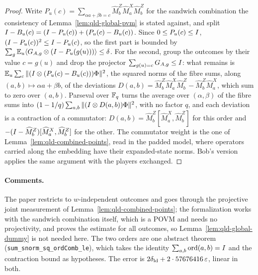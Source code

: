 \begin{proof}
\leanok
Write $P_u(c) = \sum_{\alpha a + \beta b = c} \widehat M^Z_b \widehat M^X_a \widehat M^Z_b$ for
the sandwich combination the consistency of Lemma~\ref{lem:qld-global-pvm} is stated against,
and split $I - B_u(c) = (I - P_u(c)) + (P_u(c) - B_u(c))$. Since $0 \leq P_u(c) \leq I$,
$(I - P_u(c))^2 \leq I - P_u(c)$, so the first part is bounded by
$\sum_g \mathbb E_u \langle G_{A,g} \otimes (I - P_u(g(u))) \rangle \leq \delta$. For the
second, group the outcomes by their value $c = g(u)$ and drop the projector
$\sum_{g(u) = c} G_{A,g} \leq I$: what remains is
$\mathbb E_u \sum_c \|(I \otimes (P_u(c) - B_u(c)))\Phi\|^2$, the squared norms of the fibre
sums, along $(a, b) \mapsto \alpha a + \beta b$, of the deviations
$D(a, b) = \widehat M^Z_b \widehat M^X_a \widehat M^Z_b - \widehat M^Z_b \widehat M^X_a$, which
sum to zero over $(a, b)$. Parseval over $\mathbb{F}_q$ turns the average over $(\alpha, \beta)$ of the
fibre sums into $(1 - 1/q) \sum_{a,b} \|(I \otimes D(a, b))\Phi\|^2$, with no factor $q$, and
each deviation is a contraction of a commutator:
$D(a, b) = \widehat M^Z_b [\widehat M^X_a, \widehat M^Z_b]$ for this order and
$-(I - \widehat M^Z_b)[\widehat M^X_a, \widehat M^Z_b]$ for the other. The commutator weight is
the one of Lemma~\ref{lem:qld-combined-points}, read in the padded model, where operators carried
along the embedding have their expanded-state norms. Bob's version applies the same argument with
the players exchanged.
\end{proof}

\paragraph{Comments.} The paper restricts to $w$-independent outcomes and goes through the
projective joint measurement of Lemma~\ref{lem:qld-combined-points}; the formalization works
with the sandwich combination itself, which is a POVM and needs no projectivity, and proves the
estimate for all outcomes, so Lemma~\ref{lem:qld-global-dummy} is not needed here. The two
orders are one abstract theorem (\texttt{sum\_snorm\_sq\_ordComb\_le}), which takes the identity
$\sum_{a, b} \mathrm{ord}(a, b) = I$ and the contraction bound as hypotheses. The error is
$2\delta_{\mathrm{ld}} + 2 \cdot 57676416\,\varepsilon$, linear in both.

